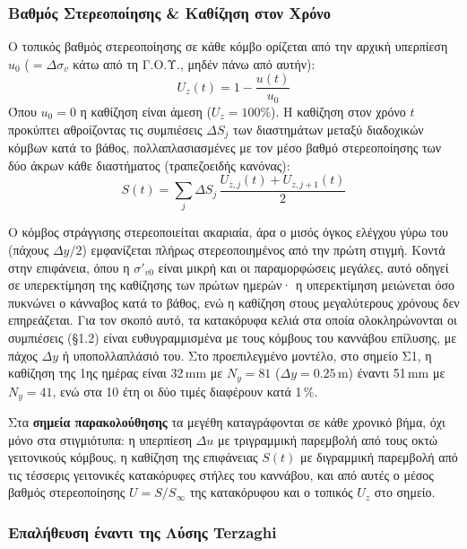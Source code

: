 \documentclass[11pt,a4paper]{article}
\begin{document}
\subsubsection{Βαθμός Στερεοποίησης \& Καθίζηση στον Χρόνο}\label{sec:settlement-time}

Ο τοπικός βαθμός στερεοποίησης σε κάθε κόμβο ορίζεται από την αρχική υπερπίεση $u_0$ ($= \Delta\sigma_v$ κάτω από τη Γ.Ο.Υ., μηδέν πάνω από αυτήν):
\begin{equation}
  U_z(t) = 1 - \frac{u(t)}{u_0}
\end{equation}
Όπου $u_0 = 0$ η καθίζηση είναι άμεση ($U_z = 100\%$). Η καθίζηση στον χρόνο $t$ προκύπτει αθροίζοντας τις συμπιέσεις $\Delta S_j$ των διαστημάτων μεταξύ διαδοχικών κόμβων κατά το βάθος, πολλαπλασιασμένες με τον μέσο βαθμό στερεοποίησης των δύο άκρων κάθε διαστήματος (τραπεζοειδής κανόνας):
\begin{equation}
  S(t) = \sum_{j} \Delta S_j\,\frac{U_{z,j}(t) + U_{z,j+1}(t)}{2}
\end{equation}

Ο κόμβος στράγγισης στερεοποιείται ακαριαία, άρα ο μισός όγκος ελέγχου γύρω του (πάχους $\Delta y/2$) εμφανίζεται πλήρως στερεοποιημένος από την πρώτη στιγμή. Κοντά στην επιφάνεια, όπου η $\sigma'_{v0}$ είναι μικρή και οι παραμορφώσεις μεγάλες, αυτό οδηγεί σε υπερεκτίμηση της καθίζησης των πρώτων ημερών· η υπερεκτίμηση μειώνεται όσο πυκνώνει ο κάνναβος κατά το βάθος, ενώ η καθίζηση στους μεγαλύτερους χρόνους δεν επηρεάζεται. Για τον σκοπό αυτό, τα κατακόρυφα κελιά στα οποία ολοκληρώνονται οι συμπιέσεις (§1.2) είναι ευθυγραμμισμένα με τους κόμβους του καννάβου επίλυσης, με πάχος $\Delta y$ ή υποπολλαπλάσιό του. Στο προεπιλεγμένο μοντέλο, στο σημείο Σ1, η καθίζηση της 1ης ημέρας είναι 32\,mm με $N_y = 81$ ($\Delta y = 0.25$\,m) έναντι 51\,mm με $N_y = 41$, ενώ στα 10 έτη οι δύο τιμές διαφέρουν κατά 1\,\%.

Στα \textbf{σημεία παρακολούθησης} τα μεγέθη καταγράφονται σε κάθε χρονικό βήμα, όχι μόνο στα στιγμιότυπα: η υπερπίεση $\Delta u$ με τριγραμμική παρεμβολή από τους οκτώ γειτονικούς κόμβους, η καθίζηση της επιφάνειας $S(t)$ με διγραμμική παρεμβολή από τις τέσσερις γειτονικές κατακόρυφες στήλες του καννάβου, και από αυτές ο μέσος βαθμός στερεοποίησης $U = S/S_\infty$ της κατακόρυφου και ο τοπικός $U_z$ στο σημείο.

\subsubsection{Επαλήθευση έναντι της Λύσης Terzaghi}
\end{document}
